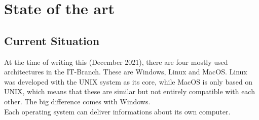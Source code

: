 \chapter{State of the art}
\section{Current Situation} 
At the time of writing this (December 2021), there are four mostly used architectures in the IT-Branch. These are Windows, Linux and MacOS. Linux was developed with the UNIX system as its core, while MacOS is only based on UNIX, which means that these are similar but not entirely compatible with each other. The big difference comes with Windows.\\
Each operating system can deliver informations about its own computer.


